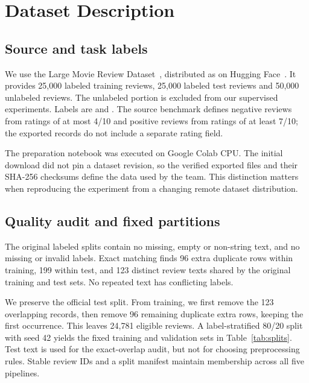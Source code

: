 \clearpage
\section{Dataset Description}\label{sec:data}
\subsection{Source and task labels}
We use the Large Movie Review Dataset~\cite{maas2011}, distributed as
 on Hugging Face~\cite{imdbhub}. It provides 25,000 labeled
training reviews, 25,000 labeled test reviews and 50,000 unlabeled reviews. The
unlabeled portion is excluded from our supervised experiments. Labels are
 and . The source benchmark defines
negative reviews from ratings of at most 4/10 and positive reviews from ratings
of at least 7/10; the exported records do not include a separate rating field.

The preparation notebook was executed on Google Colab CPU. The initial download
did not pin a dataset revision, so the verified exported files and their SHA-256
checksums define the data used by the team. This distinction matters when
reproducing the experiment from a changing remote dataset distribution.

\subsection{Quality audit and fixed partitions}
The original labeled splits contain no missing, empty or non-string text, and no
missing or invalid labels. Exact matching finds 96 extra duplicate rows within
training, 199 within test, and 123 distinct review texts shared by the original
training and test sets. No repeated text has conflicting labels.

We preserve the official test split. From training, we first remove the 123
overlapping records, then remove 96 remaining duplicate extra rows, keeping the
first occurrence. This leaves 24,781 eligible reviews. A label-stratified 80/20
split with seed 42 yields the fixed training and validation sets in
Table~\ref{tab:splits}. Test text is used for the exact-overlap audit, but not for
choosing preprocessing rules. Stable review IDs and a split manifest maintain
membership across all five pipelines.

